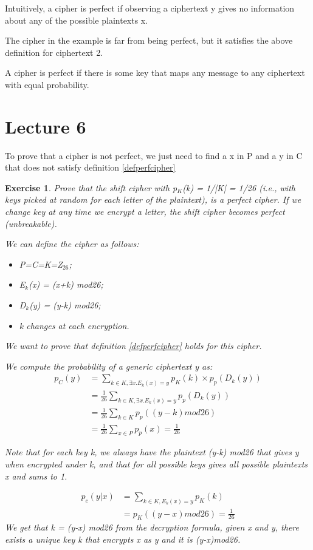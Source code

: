 \documentclass[a4paper, 12pt]{report}
\newtheorem{exercise}{\textbf{Exercise}}
\begin{document}
Intuitively, a cipher is perfect if observing a ciphertext y gives no information about any of the possible plaintexts x.

The cipher in the example is far from being perfect, but it satisfies the above definition for ciphertext 2.

A cipher is perfect if there is some key that maps any message to any ciphertext with equal probability.

\chapter*{Lecture 6}
To prove that a cipher is not perfect, we just need to find a x in P and a y in C that does not satisfy definition \ref{defperfcipher}

\begin{exercise}
	Prove that the shift cipher with p$_K$(k) = 1/|K| = 1/26 (i.e., with keys picked at random for each letter of the plaintext), is a perfect cipher. If we change key at any time we encrypt a letter, the shift cipher becomes perfect (unbreakable).
	
	We can define the cipher as follows:
	\begin{itemize}
		\item P=C=K=Z$_{26}$;
		\item E$_k$(x) = (x+k) mod26;
		\item D$_k$(y) = (y-k) mod26;
		\item k changes at each encryption.
	\end{itemize}
	We want to prove that definition \ref{defperfcipher} holds for this cipher.
	
	We compute the probability of a generic ciphertext y as:
	\setcounter{equation}{0}
	\begin{align}
	p_C(y) &= \sum_{k\in K, \exists x.E_k(x)=y}^{}p_K(k)\times p_p(D_k(y))\\
	&= \frac{1}{26} \sum_{k\in K, \exists x.E_k(x)=y}^{} p_p(D_k(y))\\
	&= \frac{1}{26}\sum_{k\in K}^{}p_p((y-k) mod26)\\
	&= \frac{1}{26}\sum_{x \in P}^{} p_p(x) = \frac{1}{26}
	\end{align}
	
	Note that for each key k, we always have the plaintext (y-k) mod26 that gives y when encrypted under k, and that for all possible keys gives all possible plaintexts x and sums to 1.
	
	\setcounter{equation}{0}
	\begin{align}
	p_c(y|x) &= \sum_{k\in K, E_k(x)=y}^{}p_K(k)\\
	&= p_K((y-x) mod26) =\frac{1}{26}
	\end{align}
	We get that k = (y-x) mod26 from the decryption formula, given x and y, there exists a unique key k that encrypts x as y and it is (y-x)mod26.
	

\end{exercise}
\end{document}
